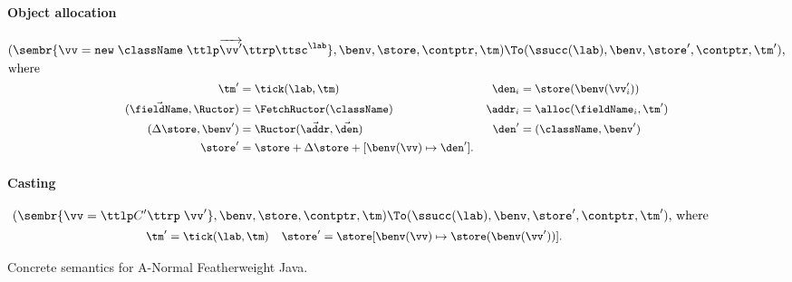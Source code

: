 \begin{figure}
\paragraph{Object allocation}
\begin{gather*}
\begin{split}
  &(
  \sembr{
    \vv = 
    {\tt new}\; \className\; \ttlp
\overrightarrow{\vv'}
  \ttrp \ttsc^\lab},
  \benv,
  \store,
  \contptr,
  \tm
  )
  \To
  (
  \ssucc(\lab),
  \benv,
  \store',
  \contptr,
  \tm'
  )\text{,}\\
&\text{where }
\end{split}\\
\begin{small}\begin{align*}
  \tm' &= \tick(\lab,\tm)
  &
  \den_i &= \store(\benv(\vv_i'))
  \\
  (\vec{\fieldName},\Ructor) &=
   \FetchRuctor(\className)
  &
  \addr_i &= \alloc(\fieldName_i,\tm')
  \\
  (\Delta \store, \benv') &= 
   \Ructor(\vec{\addr}, \vec{\den})
  &
  \den' &= (\className, \benv')
  \\
  \store' &= \store + \Delta \store + [\benv(\vv) \mapsto \den']
  \text.
\end{align*}\end{small}\end{gather*}






\paragraph{Casting}
\begin{gather*}
  (
  \sembr{\vv = \ttlp C'\ttrp\; \vv'},
  \benv,
  \store,
  \contptr,
  \tm
  )
  \To
  (
\ssucc(\lab),
  \benv,
  \store',
  \contptr,
  \tm'
  )\text{, where}\\
\begin{small}\begin{align*}
  \tm' &= \tick(\lab, \tm)
  &
  \store' &= \store[\benv(\vv) \mapsto \store(\benv(\vv'))]
  \text.
\end{align*}\end{small}\end{gather*}
\caption{Concrete semantics for A-Normal Featherweight Java.}
\label{fig:java-concrete-semantics}
\end{figure}





